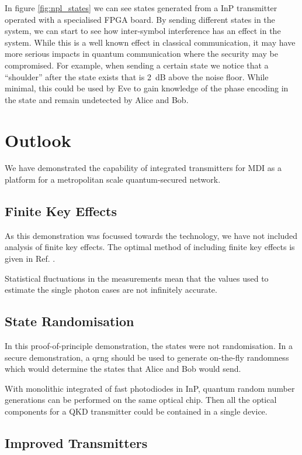 In figure \ref{fig:npl_states} we can see states generated from a \ac{InP} transmitter operated with a specialised FPGA board. By sending different states in the system, we can start to see how inter-symbol interference has an effect in the system. While this is a well known effect in classical communication, it may have more serious impacts in quantum communication where the security may be compromised. For example, when sending a certain state we notice that a ``shoulder'' after the state exists that is \SI{2}{dB} above the noise floor. While minimal, this could be used by Eve to gain knowledge of the phase encoding in the state and remain undetected by Alice and Bob.

\section{Outlook}

We have demonstrated the capability of integrated transmitters for \acl{MDI} as a platform for a metropolitan scale quantum-secured network. 

\subsection{Finite Key Effects}

As this demonstration was focussed towards the technology, we have not included analysis of finite key effects. The optimal method of including finite key effects is given in Ref. \cite{zhou2016}.

Statistical fluctuations in the measurements mean that the values used to estimate the single photon cases are not infinitely accurate. 

\subsection{State Randomisation}

In this proof-of-principle demonstration, the states were not randomisation. In a secure demonstration, a \ac{qrng} should be used to generate on-the-fly randomness which would determine the states that Alice and Bob would send. 

With monolithic integrated of fast photodiodes in \ac{InP}, quantum random number generations can be performed on the same optical chip. Then all the optical components for a \ac{QKD} transmitter could be contained in a single device.

\subsection{Improved Transmitters}

